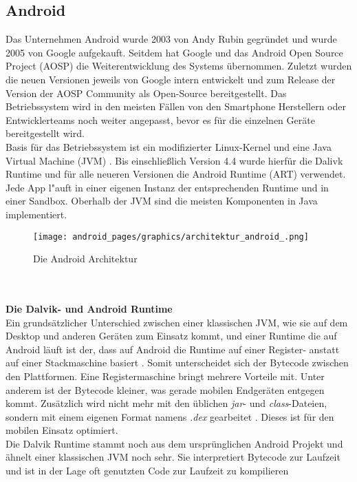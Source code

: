 \subsection{Android}
	Das Unternehmen Android wurde 2003 von Andy Rubin gegründet und wurde 2005 von
	Google aufgekauft. Seitdem hat Google und das Android Open Source Project
	(AOSP) die Weiterentwicklung des Systems übernommen. Zuletzt wurden die neuen
	Versionen jeweils von Google intern entwickelt und zum Release der Version der
	AOSP Community als Open-Source bereitgestellt. Das Betriebssystem wird in den
	meisten Fällen von den Smartphone Herstellern oder Entwicklerteams noch weiter
	angepasst, bevor es für die einzelnen Geräte bereitgestellt wird.\\
	Basis für das Betriebssystem ist ein modifizierter Linux-Kernel und eine Java
	Virtual Machine (JVM) \cite{ArtDalvik}. Bis einschließlich Version 4.4 wurde
	hierfür die Dalivk Runtime und für alle neueren Versionen die Android Runtime
	(ART) verwendet. Jede App l"auft in einer eigenen Instanz der entsprechenden
	Runtime und in einer Sandbox. Oberhalb der JVM sind die meisten Komponenten in
	Java implementiert.
	\begin{figure}[h]
		\centering
		\texttt{[image: android\_pages/graphics/architektur\_android\_.png]}
		\caption{Die Android Architektur \protect\cite[S. 2]{Elenkov2014} }
		\label{fig:architektur_android}
	\end{figure}
	\\\\
	\textbf{Die Dalvik- und Android Runtime}\\
	Ein grundsätzlicher Unterschied zwischen einer klassischen JVM, wie sie auf
	dem Desktop und anderen Geräten zum Einsatz kommt, und einer Runtime die auf
	Android läuft ist der, dass auf Android die Runtime auf einer Register-
	anstatt auf einer Stackmaschine basiert \cite{DalvikBytecode}. Somit
	unterscheidet sich der Bytecode zwischen den Plattformen. Eine
	Registermaschine bringt mehrere Vorteile mit. Unter anderem ist der Bytecode
	kleiner, was gerade mobilen Endgeräten entgegen kommt.
	Zusätzlich wird nicht mehr mit den üblichen \textit{jar}- und
	\textit{class}-Dateien, sondern mit einem eigenen Format namens \textit{.dex}
	gearbeitet \cite{DexFormat}. Dieses ist für den mobilen Einsatz optimiert.\\
	Die Dalvik Runtime stammt noch aus dem ursprünglichen Android Projekt und
	ähnelt einer klassischen JVM noch sehr. Sie interpretiert Bytecode zur
	Laufzeit und ist in der Lage oft genutzten Code zur Laufzeit zu kompilieren
